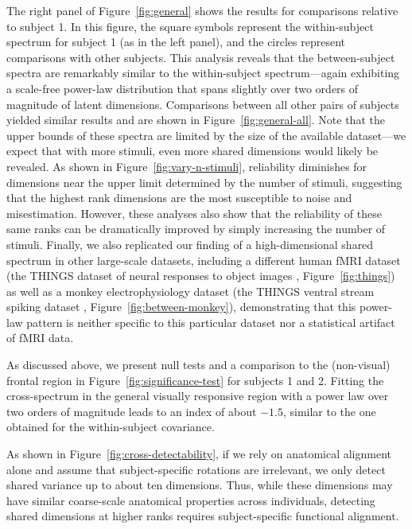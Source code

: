 \documentclass[10pt]{article}
\begin{document}
The right panel of Figure~\ref{fig:general} shows the results for comparisons relative to subject 1. In this figure, the square symbols represent the within-subject spectrum for subject 1 (as in the left panel), and the circles represent comparisons with other subjects. This analysis reveals that the between-subject spectra are remarkably similar to the within-subject spectrum---again exhibiting a scale-free power-law distribution that spans slightly over two orders of magnitude of latent dimensions. Comparisons between all other pairs of subjects yielded similar results and are shown in Figure~\ref{fig:general-all}. Note that the upper bounds of these spectra are limited by the size of the available dataset---we expect that with more stimuli, even more shared dimensions would likely be revealed. As shown in Figure~\ref{fig:vary-n-stimuli}, reliability diminishes for dimensions near the upper limit determined by the number of stimuli, suggesting that the highest rank dimensions are the most susceptible to noise and misestimation. However, these analyses also show that the reliability of these same ranks can be dramatically improved by simply increasing the number of stimuli. Finally, we also replicated our finding of a high-dimensional shared spectrum in other large-scale datasets, including a different human fMRI dataset (the THINGS dataset of neural responses to object images \autocite{Hebart2023}, Figure~\ref{fig:things}) as well as a monkey electrophysiology dataset (the THINGS ventral stream spiking dataset \autocite{Papale2025}, Figure~\ref{fig:between-monkey}), demonstrating that this power-law pattern is neither specific to this particular dataset nor a statistical artifact of fMRI data.

As discussed above, we present null tests and a comparison to the (non-visual) frontal region in Figure~\ref{fig:significance-test} for subjects 1 and 2. Fitting the cross-spectrum in the general visually responsive region with a power law over two orders of magnitude leads to an index of about \(-1.5\), similar to the one obtained for the within-subject covariance.

As shown in Figure~\ref{fig:cross-detectability}, if we rely on anatomical alignment alone and assume that subject-specific rotations are irrelevant, we only detect shared variance up to about ten dimensions. Thus, while these dimensions may have similar coarse-scale anatomical properties across individuals, detecting shared dimensions at higher ranks requires subject-specific functional alignment.
\end{document}
